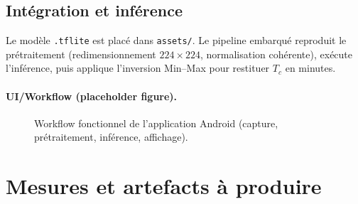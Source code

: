 \subsection{Intégration et inférence}
Le modèle \texttt{.tflite} est placé dans \texttt{assets/}. Le pipeline embarqué reproduit le prétraitement (redimensionnement \(224\times224\), normalisation cohérente), exécute l’inférence, puis applique l’inversion Min--Max pour restituer \(T_c\) en minutes.



\paragraph{UI/Workflow (placeholder figure).}
\begin{figure}[h!]
    \centering
    \caption{Workflow fonctionnel de l’application Android (capture, prétraitement, inférence, affichage).}
    \label{fig:app_workflow}
\end{figure}

\section{Mesures et artefacts à produire}
\label{sec:mesures_artefacts}

